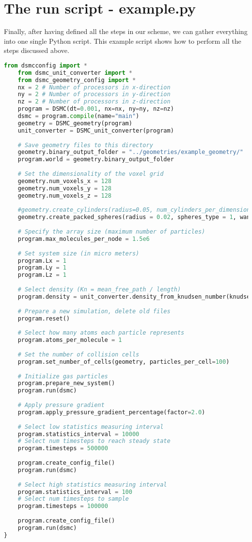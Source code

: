 \section{The run script - example.py}
Finally, after having defined all the steps in our scheme, we can gather everything into one single Python script. This example script shows how to perform all the steps discussed above. 
\begin{lstlisting}[caption=example.py, label=lst:dsmc_example_script, language=Python]
	from dsmcconfig import *
	from dsmc_unit_converter import *
	from dsmc_geometry_config import *
	nx = 2 # Number of processors in x-direction
	ny = 2 # Number of processors in y-direction
	nz = 2 # Number of processors in z-direction
	program = DSMC(dt=0.001, nx=nx, ny=ny, nz=nz)
	dsmc = program.compile(name="main")
	geometry = DSMC_geometry(program)
	unit_converter = DSMC_unit_converter(program)
	
	# Save geometry files to this directory
	geometry.binary_output_folder = "../geometries/example_geometry/"
	program.world = geometry.binary_output_folder
	
	# Set the dimensionality of the voxel grid
	geometry.num_voxels_x = 128
	geometry.num_voxels_y = 128
	geometry.num_voxels_z = 128
	
	#geometry.create_cylinders(radius=0.05, num_cylinders_per_dimension = 4)
	geometry.create_packed_spheres(radius = 0.02, spheres_type = 1, wanted_porosity = 0.5)
	
	# Specify the array size (maximum number of particles)
	program.max_molecules_per_node = 1.5e6
	
	# Set system size (in micro meters)
	program.Lx = 1
	program.Ly = 1
	program.Lz = 1
	
	# Select density (Kn = mean_free_path / length)
	program.density = unit_converter.density_from_knudsen_number(knudsen_number=1.0, length=program.Ly)
	
	# Prepare a new simulation, delete old files
	program.reset()
	
	# Select how many atoms each particle represents
	program.atoms_per_molecule = 1
	
	# Set the number of collision cells
	program.set_number_of_cells(geometry, particles_per_cell=100)
	
	# Initialize gas particles
	program.prepare_new_system()
	program.run(dsmc)
	
	# Apply pressure gradient
	program.apply_pressure_gradient_percentage(factor=2.0)
	
	# Select low statistics measuring interval
	program.statistics_interval = 10000
	# Select num timesteps to reach steady state
	program.timesteps = 500000
	
	program.create_config_file()
	program.run(dsmc)
	
	# Select high statistics measuring interval
	program.statistics_interval = 100
	# Select num timesteps to sample
	program.timesteps = 100000
	
	program.create_config_file()
	program.run(dsmc)
}
\end{lstlisting}
